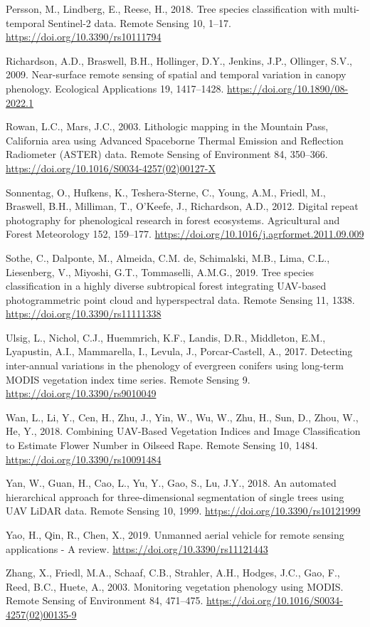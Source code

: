 \documentclass[]{article}
\begin{document}
\leavevmode\hypertarget{ref-Persson2018}{}%
Persson, M., Lindberg, E., Reese, H., 2018. Tree species classification
with multi-temporal Sentinel-2 data. Remote Sensing 10, 1--17.
\url{https://doi.org/10.3390/rs10111794}

\leavevmode\hypertarget{ref-Richardson2009}{}%
Richardson, A.D., Braswell, B.H., Hollinger, D.Y., Jenkins, J.P.,
Ollinger, S.V., 2009. Near-surface remote sensing of spatial and
temporal variation in canopy phenology. Ecological Applications 19,
1417--1428. \url{https://doi.org/10.1890/08-2022.1}

\leavevmode\hypertarget{ref-Rowan2003}{}%
Rowan, L.C., Mars, J.C., 2003. Lithologic mapping in the Mountain Pass,
California area using Advanced Spaceborne Thermal Emission and
Reflection Radiometer (ASTER) data. Remote Sensing of Environment 84,
350--366. \url{https://doi.org/10.1016/S0034-4257(02)00127-X}

\leavevmode\hypertarget{ref-Sonnentag2012}{}%
Sonnentag, O., Hufkens, K., Teshera-Sterne, C., Young, A.M., Friedl, M.,
Braswell, B.H., Milliman, T., O'Keefe, J., Richardson, A.D., 2012.
Digital repeat photography for phenological research in forest
ecosystems. Agricultural and Forest Meteorology 152, 159--177.
\url{https://doi.org/10.1016/j.agrformet.2011.09.009}

\leavevmode\hypertarget{ref-Sothe2019a}{}%
Sothe, C., Dalponte, M., Almeida, C.M. de, Schimalski, M.B., Lima, C.L.,
Liesenberg, V., Miyoshi, G.T., Tommaselli, A.M.G., 2019. Tree species
classification in a highly diverse subtropical forest integrating
UAV-based photogrammetric point cloud and hyperspectral data. Remote
Sensing 11, 1338. \url{https://doi.org/10.3390/rs11111338}

\leavevmode\hypertarget{ref-Ulsig2017a}{}%
Ulsig, L., Nichol, C.J., Huemmrich, K.F., Landis, D.R., Middleton, E.M.,
Lyapustin, A.I., Mammarella, I., Levula, J., Porcar-Castell, A., 2017.
Detecting inter-annual variations in the phenology of evergreen conifers
using long-term MODIS vegetation index time series. Remote Sensing 9.
\url{https://doi.org/10.3390/rs9010049}

\leavevmode\hypertarget{ref-Wan2018}{}%
Wan, L., Li, Y., Cen, H., Zhu, J., Yin, W., Wu, W., Zhu, H., Sun, D.,
Zhou, W., He, Y., 2018. Combining UAV-Based Vegetation Indices and Image
Classification to Estimate Flower Number in Oilseed Rape. Remote Sensing
10, 1484. \url{https://doi.org/10.3390/rs10091484}

\leavevmode\hypertarget{ref-Yan2018a}{}%
Yan, W., Guan, H., Cao, L., Yu, Y., Gao, S., Lu, J.Y., 2018. An
automated hierarchical approach for three-dimensional segmentation of
single trees using UAV LiDAR data. Remote Sensing 10, 1999.
\url{https://doi.org/10.3390/rs10121999}

\leavevmode\hypertarget{ref-Yao2019b}{}%
Yao, H., Qin, R., Chen, X., 2019. Unmanned aerial vehicle for remote
sensing applications - A review.
\url{https://doi.org/10.3390/rs11121443}

\leavevmode\hypertarget{ref-Zhang2003}{}%
Zhang, X., Friedl, M.A., Schaaf, C.B., Strahler, A.H., Hodges, J.C.,
Gao, F., Reed, B.C., Huete, A., 2003. Monitoring vegetation phenology
using MODIS. Remote Sensing of Environment 84, 471--475.
\url{https://doi.org/10.1016/S0034-4257(02)00135-9}
\end{document}
